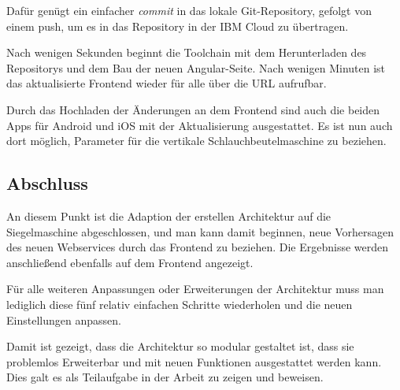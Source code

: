 Dafür genügt ein einfacher \textit{commit} in das lokale Git-Repository, gefolgt von einem push, um es in das Repository
in der IBM Cloud zu übertragen.

Nach wenigen Sekunden beginnt die Toolchain mit dem Herunterladen des Repositorys und dem Bau der neuen Angular-Seite.
Nach wenigen Minuten ist das aktualisierte Frontend wieder für alle über die URL aufrufbar.

Durch das Hochladen der Änderungen an dem Frontend sind auch die beiden Apps für Android und iOS mit der Aktualisierung
ausgestattet. Es ist nun auch dort möglich, Parameter für die vertikale Schlauchbeutelmaschine zu beziehen.

\subsection{Abschluss}
An diesem Punkt ist die Adaption der erstellen Architektur auf die Siegelmaschine abgeschlossen, und man kann damit
beginnen, neue Vorhersagen des neuen Webservices durch das Frontend zu beziehen. Die Ergebnisse werden anschließend
ebenfalls auf dem Frontend angezeigt.

Für alle weiteren Anpassungen oder Erweiterungen der Architektur muss man lediglich diese fünf relativ einfachen
Schritte wiederholen und die neuen Einstellungen anpassen.

Damit ist gezeigt, dass die Architektur so modular gestaltet ist, dass sie problemlos Erweiterbar und mit neuen
Funktionen ausgestattet werden kann. Dies galt es als Teilaufgabe in der Arbeit zu zeigen und beweisen.
